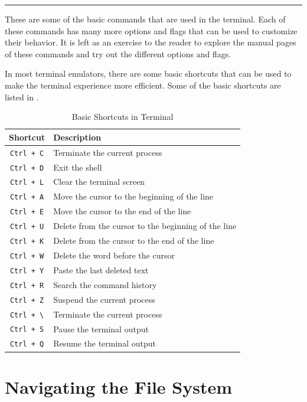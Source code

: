 \vspace{5mm}
\hrule
\vspace{3mm}

These are some of the basic commands that are used in the terminal.
Each of these commands has many more options and flags that can be used to customize their behavior.
It is left as an exercise to the reader to explore the manual pages of these commands and try out the different options and flags.

In most terminal emulators, there are some basic shortcuts that can be used to make the terminal experience more efficient.
Some of the basic shortcuts are listed in .

\begin{table}[h!]
\caption{Basic Shortcuts in Terminal}
\begin{tabular}{ c l }
  \toprule
 Shortcut & Description \\
 \midrule
  \texttt{Ctrl + C} & Terminate the current process\\
  \texttt{Ctrl + D} & Exit the shell \\
  \texttt{Ctrl + L} & Clear the terminal screen \\
  \texttt{Ctrl + A} & Move the cursor to the beginning of the line \\
  \texttt{Ctrl + E} & Move the cursor to the end of the line \\
  \texttt{Ctrl + U} & Delete from the cursor to the beginning of the line \\
  \texttt{Ctrl + K} & Delete from the cursor to the end of the line \\
  \texttt{Ctrl + W} & Delete the word before the cursor \\
  \texttt{Ctrl + Y} & Paste the last deleted text \\
  \texttt{Ctrl + R} & Search the command history \\
  \texttt{Ctrl + Z} & Suspend the current process \\
  \texttt{Ctrl + \textbackslash} & Terminate the current process \\
  \texttt{Ctrl + S} & Pause the terminal output \\
  \texttt{Ctrl + Q} & Resume the terminal output \\
  \bottomrule
\end{tabular}
\end{table}

\vfill
\pagebreak
\section{Navigating the File System}

